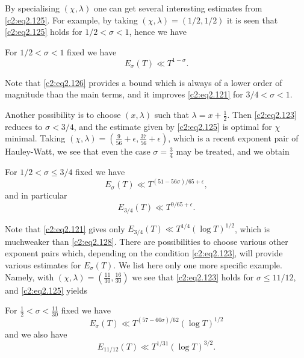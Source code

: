 By specialising $(\chi, \lambda)$ one can get several interesting
estimates from \eqref{c2:eq2.125}. For example, by taking $(\chi,
\lambda)= (1/2, 1/2)$ it is seen that \eqref{c2:eq2.125} holds for
$1/2 < \sigma < 1$, hence we have

\begin{coro}\label{c2:coro1}
  For $1/2 < \sigma < 1$ fixed we have
  \begin{equation}
    E_\sigma(T) \ll T^{1- \sigma}.\label{c2:eq2.126}
  \end{equation}
\end{coro}

Note that \eqref{c2:eq2.126} provides a bound which is always of a
lower order of magnitude than the main terms, and it improves
\eqref{c2:eq2.121} for $3/4 < \sigma < 1$. 

Another possibility is to choose $(x, \lambda)$ such that $\lambda
= x + \frac{1}{2}$. Then \eqref{c2:eq2.123} reduces to $\sigma <
3/4$, and the estimate given by \eqref{c2:eq2.125} is optimal for
$\chi$ minimal. Taking $(\chi, \lambda)= \left(\frac{9}{56} + \epsilon, 
\frac{37}{56}+ \epsilon \right)$, which is a recent exponent pair of
Hauley-Watt, we see that even the case $\sigma =\frac{3}{4}$ may be
treated, and we obtain

\begin{coro}\label{c2:coro2}
  For $1/2 < \sigma \leq 3/4$ fixed we have
  \begin{equation}
    E_\sigma (T) \ll T^{(51-56 \sigma)/ 65 +
      \epsilon}, \label{c2:eq2.127} 
  \end{equation}
  and in particular
  \begin{equation}
    E_{3/4}(T) \ll T^{9/65+ \epsilon}.\label{c2:eq2.128}
  \end{equation}
\end{coro}

Note that \eqref{c2:eq2.121} gives only $E_{3/4}(T) \ll T^{1/4}(\log
T)^{1/2}$, which is much\pageoriginale weaker than
\eqref{c2:eq2.128}. There are possibilities to choose various other
exponent pairs which, depending on the condition \eqref{c2:eq2.123},
will provide various estimates for $E_\sigma(T)$. We list here only
one more specific example. Namely, with $(\chi, \lambda) =
\left(\frac{11}{30}, \frac{16}{30} \right)$ we see that
\eqref{c2:eq2.123} holds for $\sigma \leq 11/12$, and
\eqref{c2:eq2.125} yields

\begin{coro}\label{c2:coro3}
  For $\frac{1}{2} < \sigma < \frac{11}{30}$ fixed we have
  $$
  E_\sigma (T) \ll T^{(57 -60\sigma)/62} (\log T)^{1/2}
  $$
  and we also have
  $$
  E_{11/12} (T) \ll T^{1/31} (\log T)^{3/2}.
  $$
\end{coro}

